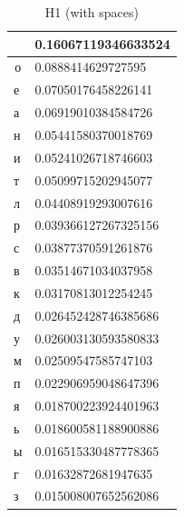 \begin{table}[]
\centering
\caption{H1 (with spaces)}
\label{tab:my-table}
\begin{tabular}{ll}
\hline
\multicolumn{1}{|l|}{}  & \multicolumn{1}{l|}{0.16067119346633524}    \\ \hline
\multicolumn{1}{|c|}{о} & \multicolumn{1}{l|}{0.0888414629727595}     \\ \hline
\multicolumn{1}{|l|}{е} & \multicolumn{1}{l|}{0.07050176458226141}    \\ \hline
\multicolumn{1}{|l|}{а} & \multicolumn{1}{l|}{0.06919010384584726}    \\ \hline
\multicolumn{1}{|l|}{н} & \multicolumn{1}{l|}{0.05441580370018769}    \\ \hline
\multicolumn{1}{|l|}{и} & \multicolumn{1}{l|}{0.05241026718746603}    \\ \hline
\multicolumn{1}{|l|}{т} & \multicolumn{1}{l|}{0.05099715202945077}    \\ \hline
\multicolumn{1}{|l|}{л} & \multicolumn{1}{l|}{0.04408919293007616}    \\ \hline
\multicolumn{1}{|l|}{р} & \multicolumn{1}{l|}{0.039366127267325156}   \\ \hline
\multicolumn{1}{|l|}{с} & \multicolumn{1}{l|}{0.03877370591261876}    \\ \hline
\multicolumn{1}{|l|}{в} & \multicolumn{1}{l|}{0.03514671034037958}    \\ \hline
\multicolumn{1}{|l|}{к} & \multicolumn{1}{l|}{0.03170813012254245}    \\ \hline
\multicolumn{1}{|l|}{д} & \multicolumn{1}{l|}{0.026452428746385686}   \\ \hline
\multicolumn{1}{|l|}{у} & \multicolumn{1}{l|}{0.026003130593580833}   \\ \hline
\multicolumn{1}{|l|}{м} & \multicolumn{1}{l|}{0.02509547585747103}    \\ \hline
\multicolumn{1}{|l|}{п} & \multicolumn{1}{l|}{0.022906959048647396}   \\ \hline
\multicolumn{1}{|l|}{я} & \multicolumn{1}{l|}{0.018700223924401963}   \\ \hline
\multicolumn{1}{|l|}{ь} & \multicolumn{1}{l|}{0.018600581188900886}   \\ \hline
\multicolumn{1}{|l|}{ы} & \multicolumn{1}{l|}{0.016515330487778365}   \\ \hline
\multicolumn{1}{|l|}{г} & \multicolumn{1}{l|}{0.01632872681947635}    \\ \hline
\multicolumn{1}{|l|}{з} & \multicolumn{1}{l|}{0.015008007652562086}   \\ \hline

\end{tabular}
\end{table}
